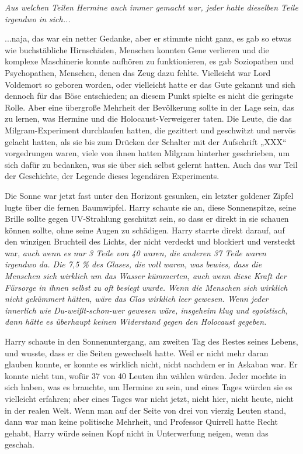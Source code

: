 {\emph{Aus welchen Teilen Hermine auch immer gemacht war, jeder hatte dieselben Teile irgendwo in sich...}

...naja, das war ein netter Gedanke, aber er stimmte nicht ganz, es gab so etwas wie buchstäbliche Hirnschäden, Menschen konnten Gene verlieren und die komplexe Maschinerie konnte aufhören zu funktionieren, es gab Soziopathen und Psychopathen, Menschen, denen das Zeug dazu fehlte. Vielleicht war Lord Voldemort so geboren worden, oder vielleicht hatte er das Gute gekannt und sich dennoch für das Böse entschieden; an diesem Punkt spielte es nicht die geringste Rolle. Aber eine übergroße Mehrheit der Bevölkerung sollte in der Lage sein, das zu lernen, was Hermine und die Holocaust-Verweigerer taten. Die Leute, die das Milgram-Experiment durchlaufen hatten, die gezittert und geschwitzt und nervös gelacht hatten, als sie bis zum Drücken der Schalter mit der Aufschrift „XXX“ vorgedrungen waren, viele von ihnen hatten Milgram hinterher geschrieben, um sich dafür zu bedanken, was sie über sich selbst gelernt hatten. Auch das war Teil der Geschichte, der Legende dieses legendären Experiments.

Die Sonne war jetzt fast unter den Horizont gesunken, ein letzter goldener Zipfel lugte über die fernen Baumwipfel. Harry schaute sie an, diese Sonnenspitze, seine Brille sollte gegen UV-Strahlung geschützt sein, so dass er direkt in sie schauen können sollte, ohne seine Augen zu schädigen. Harry starrte direkt darauf, auf den winzigen Bruchteil des Lichts, der nicht verdeckt und blockiert und versteckt war, \emph{auch wenn es nur 3 Teile von 40 waren, die anderen 37 Teile waren irgendwo da. Die 7,5 \% des Glases, die voll waren, was bewies, dass die Menschen sich wirklich um das Wasser kümmerten, auch wenn diese Kraft der Fürsorge in ihnen selbst zu oft besiegt wurde. Wenn die Menschen sich wirklich nicht gekümmert hätten, wäre das Glas wirklich leer gewesen. Wenn jeder innerlich wie Du-weißt-schon-wer gewesen wäre, insgeheim klug und egoistisch, dann hätte es überhaupt keinen Widerstand gegen den Holocaust gegeben.}

Harry schaute in den Sonnenuntergang, am zweiten Tag des Restes seines Lebens, und wusste, dass er die Seiten gewechselt hatte. Weil er nicht mehr daran glauben konnte, er konnte es wirklich nicht, nicht nachdem er in Askaban war. Er konnte nicht tun, wofür 37 von 40 Leuten ihn wählen würden. Jeder mochte in sich haben, was es brauchte, um Hermine zu sein, und eines Tages würden sie es vielleicht erfahren; aber eines Tages war nicht jetzt, nicht hier, nicht heute, nicht in der realen Welt. Wenn man auf der Seite von drei von vierzig Leuten stand, dann war man keine politische Mehrheit, und Professor Quirrell hatte Recht gehabt, Harry würde seinen Kopf nicht in Unterwerfung neigen, wenn das geschah.

}
